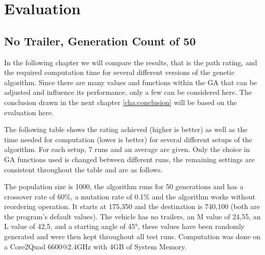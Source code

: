 \chapter{Evaluation}
\label{cha:evaluation}

\section{No Trailer, Generation Count of 50}
\label{sec:no_trailer_50}

In the following chapter we will compare the results, that is the path rating, and the required computation time for several different versions of the genetic algorithm.
Since there are many values and functions within the GA that can be adjusted and influence its performance, only a few can be considered here. The conclusion drawn in the next chapter \ref{cha:conclusion} will be based on the evaluation here.

The following table shows the rating achieved (higher is better) as well as the time needed for computation (lower is better) for several different setups of the algorithm. For each setup, 7 runs and an average are given. Only the choice in GA functions used is changed between different runs, the remaining settings are consistent throughout the table and are as follows.

The population size is 1000, the algorithm runs for 50 generations and has a crossover rate of 60\%, a mutation rate of 0.1\% and the algorithm works without reordering operation. It starts at 175,350 and the destination is 740,100 (both are the program's default values). The vehicle has no trailers, an M value of 24,55, an L value of 42,5, and a starting angle of 45°, these values have been randomly generated and were then kept throughout all test runs.
Computation was done on a Core2Quad 6600@2.4GHz with 4GB of System Memory.

